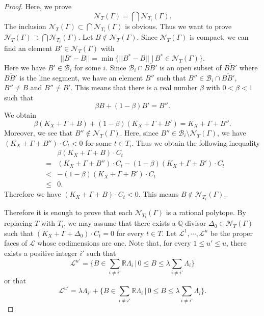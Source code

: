 \documentclass[12pt,twoside]{amsart}
\theoremstyle{definition}
\newcommand{\Q}{$\mathbb{Q}$}
\begin{document}
\begin{proof}
Here, we prove 
$$\mathcal N_T(\Gamma)=\bigcap\mathcal N_{T_i}(\Gamma).$$
The inclusion $\mathcal N_T(\Gamma)\subset \bigcap\mathcal N_{T_i}(\Gamma)$ 
is obvious. 
Thus we want to prove $\mathcal N_T(\Gamma)\supset \bigcap\mathcal N_{T_i}(\Gamma)$. 
Let $B \not\in \mathcal N_T(\Gamma)$. 
Since $\mathcal{N}_T(\Gamma)$ is compact, 
we can find an element $B'\in \mathcal N_T(\Gamma)$ with 
$$||B'-B||=\min \{||B^*-B||\,\,|\,B^*\in \mathcal N_T(\Gamma)\}.$$
Here we have $B'\in \mathcal B_i$ for some $i$. 
Since $\mathcal B_i\cap \overline{BB'}$ is 
an open subset of $\overline{BB'}$ 
where $\overline{BB'}$ is the line segment, 
we have an element $B''$ 
such that $B''\in \mathcal B_i\cap \overline{BB'}$, 
$B''\neq B$ and $B''\neq B'$. 
This means that there is a real number $\beta$ with $0<\beta<1$ such that 
$$\beta B+(1-\beta)B'=B''.$$ 
We obtain 
$$\beta (K_X+\Gamma+B)+(1-\beta)(K_X+\Gamma+B')=K_X+\Gamma+B''.$$
Moreover, we see that $B''\not\in \mathcal N_T(\Gamma)$. 
Here, since $B''\in \mathcal B_i \setminus \mathcal N_T(\Gamma)$, 
we have $(K_X+\Gamma+B'')\cdot C_t<0$ for some $t\in T_i$. 
Thus we obtain the following inequality 
\begin{eqnarray*}
&&\beta(K_X+\Gamma+B)\cdot C_t\\
&=&
(K_X+\Gamma+B'')\cdot C_t-(1-\beta)(K_X+\Gamma+B')\cdot C_t\\
&<&-(1-\beta)(K_X+\Gamma+B')\cdot C_t\\
&\leq&0.
\end{eqnarray*} 
Therefore we have $(K_X+\Gamma+B)\cdot C_t<0$. 
This means $B\not\in \mathcal N_{T_i}(\Gamma)$. 

Therefore it is enough to prove that each $\mathcal N_{T_i}(\Gamma)$ 
is a rational polytope. 
By replacing $T$ with $T_i$, 
we may assume that there exists 
a \Q-divisor $\Delta_{0}\in \mathcal N_T(\Gamma)$ 
such that $(K_X+\Gamma+\Delta_{0})\cdot C_t=0$ for every $t\in T$. 
Let $\mathcal L^1, \cdots ,\mathcal L^u$ be 
the proper faces of $\mathcal L$ whose codimensions are one.  
Note that, for every $1\leq u'\leq u$, 
there exists a positive integer $i'$ such that 
\begin{equation}
\mathcal L^{u'}=\{B\in \sum_{i\neq i'}\mathbb{R}\Lambda_i\,
|\,0\leq B\leq \lambda\sum_{i\neq i'}\Lambda_i\}
\tag{I}\label{I}
\end{equation}
or that 
\begin{equation}
\mathcal L^{u'}=\lambda\Lambda_{i'}+\{B\in \sum_{i\neq i'}\mathbb{R}\Lambda_i\,
|\,0\leq B\leq \lambda\sum_{i\neq i'}\Lambda_i\}.
\tag{II}\label{II}
\end{equation}


\end{proof}
\end{document}
